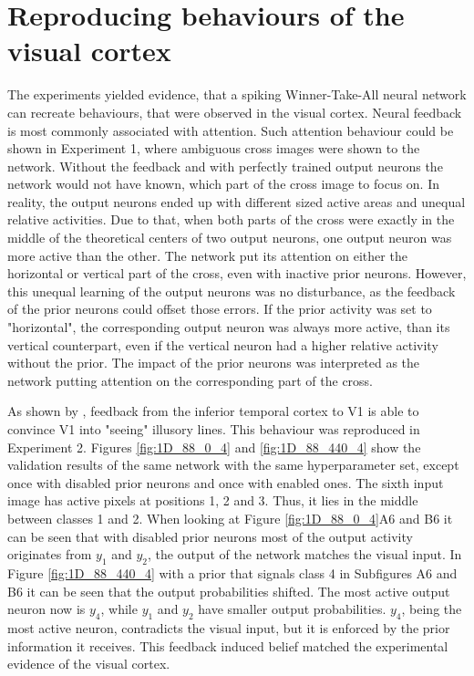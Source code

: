 \section{Reproducing behaviours of the visual cortex}
The experiments yielded evidence, that a spiking Winner-Take-All neural network can recreate behaviours, that were observed in the visual cortex. Neural feedback is most commonly associated with attention. Such attention behaviour could be shown in Experiment 1, where ambiguous cross images were shown to the network. Without the feedback and with perfectly trained output neurons the network would not have known, which part of the cross image to focus on. In reality, the output neurons ended up with different sized active areas and unequal relative activities. Due to that, when both parts of the cross were exactly in the middle of the theoretical centers of two output neurons, one output neuron was more active than the other. The network put its attention on either the horizontal or vertical part of the cross, even with inactive prior neurons. However, this unequal learning of the output neurons was no disturbance, as the feedback of the prior neurons could offset those errors. If the prior activity was set to "horizontal", the corresponding output neuron was always more active, than its vertical counterpart, even if the vertical neuron had a higher relative activity without the prior. The impact of the prior neurons was interpreted as the network putting attention on the corresponding part of the cross.

As shown by \citet{HierachicalBayesVisualCortex}, feedback from the inferior temporal cortex to V1 is able to convince V1 into "seeing" illusory lines. This behaviour was reproduced in Experiment 2. Figures \ref{fig:1D_88_0_4} and \ref{fig:1D_88_440_4} show the validation results of the same network with the same hyperparameter set, except once with disabled prior neurons and once with enabled ones. The sixth input image has active pixels at positions 1, 2 and 3. Thus, it lies in the middle between classes 1 and 2. When looking at Figure \ref{fig:1D_88_0_4}A6 and B6 it can be seen that with disabled prior neurons most of the output activity originates from $y_1$ and $y_2$, the output of the network  matches the visual input. In Figure \ref{fig:1D_88_440_4} with a prior that signals class 4 in Subfigures A6 and B6 it can be seen that the output probabilities shifted. The most active output neuron now is $y_4$, while $y_1$ and $y_2$ have smaller output probabilities. $y_4$, being the most active neuron, contradicts the visual input, but it is enforced by the prior information it receives. This feedback induced belief matched the experimental evidence of the visual cortex.

